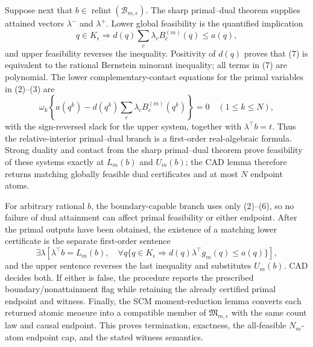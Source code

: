 Suppose next that \(b\in\operatorname{relint}(\mathcal B_{m,\epsilon})\).  The sharp primal--dual theorem supplies attained vectors \(\lambda^-\) and \(\lambda^+\).  Lower global feasibility is the quantified implication
\[
 q\in K_{\epsilon}\Longrightarrow
 d(q)\sum_c\lambda_cB_c^{(m)}(q)\leq a(q),
\tag{7}
\]
and upper feasibility reverses the inequality.  Positivity of \(d(q)\) proves that (7) is equivalent to the rational Bernstein minorant inequality; all terms in (7) are polynomial.  The lower complementary-contact equations for the primal variables in (2)--(3) are
\[
 \omega_k\left\{a(q^k)-d(q^k)\sum_c\lambda_cB_c^{(m)}(q^k)\right\}=0
 \quad(1\leq k\leq N),
\tag{8}
\]
with the sign-reversed slack for the upper system, together with \(\lambda^{\top}b=t\).  Thus the relative-interior primal--dual branch is a first-order real-algebraic formula.  Strong duality and contact from the sharp primal--dual theorem prove feasibility of these systems exactly at \(L_m(b)\) and \(U_m(b)\); the CAD lemma therefore returns matching globally feasible dual certificates and at most \(N\) endpoint atoms.

For arbitrary rational \(b\), the boundary-capable branch uses only (2)--(6), so no failure of dual attainment can affect primal feasibility or either endpoint.  After the primal outputs have been obtained, the existence of a matching lower certificate is the separate first-order sentence
\[
 \exists\lambda\left[
 \lambda^{\top}b=L_m(b),\quad
 \forall q\{q\in K_{\epsilon}\Rightarrow
 d(q)\lambda^{\top}g_m(q)\leq a(q)\}
 \right],
\tag{9}
\]
and the upper sentence reverses the last inequality and substitutes \(U_m(b)\).  CAD decides both.  If either is false, the procedure reports the prescribed boundary/nonattainment flag while retaining the already certified primal endpoint and witness.  Finally, the SCM moment-reduction lemma converts each returned atomic measure into a compatible member of \(\mathfrak M_{m,\epsilon}\) with the same count law and causal endpoint.  This proves termination, exactness, the all-feasible \(N_m\)-atom endpoint cap, and the stated witness semantics.